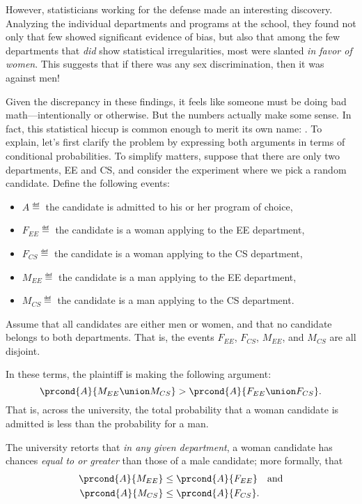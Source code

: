However, statisticians working for the defense made an interesting
discovery.  Analyzing the individual departments and programs at the
school, they found not only that few showed significant evidence of bias, but
also that among the few departments that \emph{did} show
statistical irregularities, most were slanted \emph{in favor of women}.
This suggests that if there was any sex discrimination, then it was
against men!  

Given the discrepancy in these findings, it feels like someone must be
doing bad math---intentionally or otherwise.  But the numbers actually
make some sense.  In fact, this statistical hiccup is common enough to
merit its own name: .  To explain, let's first
clarify the problem by expressing both arguments in terms of
conditional probabilities.  To simplify matters, suppose that there
are only two departments, EE and CS, and consider the experiment where
we pick a random candidate.  Define the following events:
%
\begin{itemize}
\item $A \eqdef$ the candidate is admitted to his or her program of choice,
\item $F_{EE} \eqdef$ the candidate is a woman applying to the EE department,
\item $F_{CS} \eqdef$ the candidate is a woman applying to the CS department,
\item $M_{EE} \eqdef$ the candidate is a man applying to the EE department,
\item $M_{CS} \eqdef$ the candidate is a man applying to the CS department.
\end{itemize}
Assume that all candidates are either men or women, and that no
candidate belongs to both departments.  That is, the events $F_{EE}$,
$F_{CS}$, $M_{EE}$, and $M_{CS}$ are all disjoint.

In these terms, the plaintiff is making the following argument:
\[
    \prcond{A}{M_{EE} \union M_{CS}} > \prcond{A}{F_{EE} \union F_{CS}}.
\]
That is, across the university, the total probability that a woman candidate
is admitted is less than the probability for a man.

The university retorts that \emph{in any given department}, a woman
candidate has chances \emph{equal to or greater} than those of a male
candidate; more formally, that
\begin{align*}
\prcond{A}{M_{EE}} & \leq \prcond{A}{F_{EE}} \quad\text{and}\\
\prcond{A}{M_{CS}} & \leq \prcond{A}{F_{CS}}.
\end{align*}

